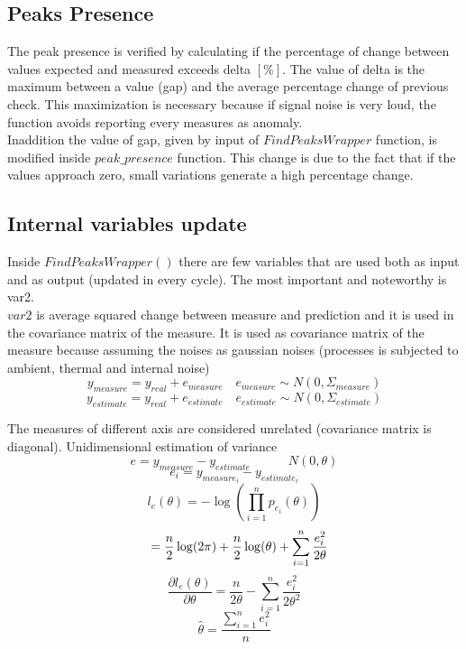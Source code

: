 \documentclass[journal]{IEEEtran}
\begin{document}
\subsection{Peaks Presence}
The peak presence is verified by calculating if the percentage of change between values expected and measured exceeds delta \([\%]\).
The value of delta is the maximum between a value (gap) and the average percentage change of previous check. This maximization is necessary because if signal noise is very loud, the function avoids reporting every measures as anomaly.
\\ Inaddition the value of gap, given by input of \(FindPeaksWrapper\) function, is modified inside \(peak\_presence\) function. This change is due to the fact that if the values approach zero, small variations generate a high percentage change. 

\subsection{Internal variables update}
Inside \(FindPeaksWrapper()\) there are few variables that are used both as input and as output (updated in every cycle). The most important and noteworthy is var2.
\\\(var2\) is average squared change between measure and prediction and it is used in the covariance matrix of the measure.
It is used as covariance matrix of the measure because assuming the noises as gaussian noises (processes is subjected to ambient, thermal and internal noise)
\begin{displaymath}
    y_{measure} = y_{real} + e_{measure}  \quad  e_{measure}  \sim  N(0, \Sigma_{measure})
\end{displaymath}
\begin{displaymath}
    y_{estimate} = y_{real} + e_{estimate}  \quad  e_{estimate}  \sim  N(0, \Sigma_{estimate})
\end{displaymath}

The measures of different axis are considered unrelated (covariance matrix is diagonal).
Unidimensional estimation of variance
\begin{displaymath}
    e = y_{measure} - y_{estimate} \quad \quad \quad N(0, \theta)
\end{displaymath}
\begin{displaymath}
    e_{i} = y_{measure_{i}} - y_{estimate_{i}}
\end{displaymath}
\begin{displaymath}
    l_{e}(\theta) = -\log \left ( \prod_{i=1}^n p_{e_i}(\theta) \right ) 
\end{displaymath}
\begin{displaymath}
    \hspace{3mm} = \frac{n}{2}\log(2\pi) + \frac{n}{2}\log(\theta) + \sum_{i=1}^n \frac{e_i^2}{2\theta}
\end{displaymath}
\begin{displaymath}
    \frac{\partial l_{e}(\theta)}{\partial \theta} = \frac{n}{2\theta}- \sum_{i=1}^n \frac{e_i^2}{2\theta^2}
\end{displaymath}
\begin{displaymath}
    \hat\theta = \frac{\sum_{i=1}^n e_i^2}{n}
\end{displaymath}
\end{document}
